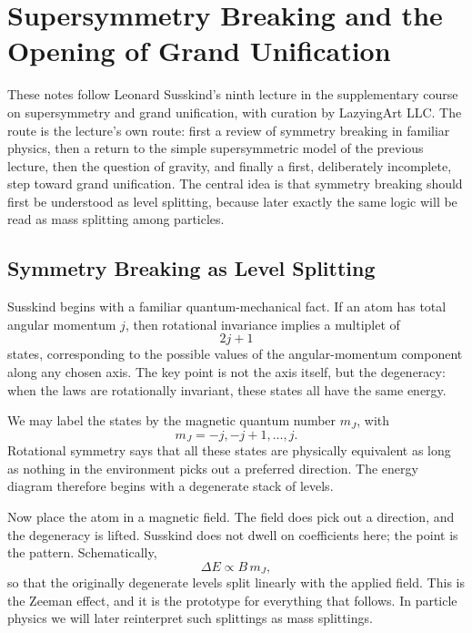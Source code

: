 \chapter{Supersymmetry Breaking and the Opening of Grand Unification}

These notes follow Leonard Susskind's ninth lecture in the supplementary course on supersymmetry and grand unification, with curation by LazyingArt LLC. The route is the lecture's own route: first a review of symmetry breaking in familiar physics, then a return to the simple supersymmetric model of the previous lecture, then the question of gravity, and finally a first, deliberately incomplete, step toward grand unification. The central idea is that symmetry breaking should first be understood as level splitting, because later exactly the same logic will be read as mass splitting among particles.

\section{Symmetry Breaking as Level Splitting}

Susskind begins with a familiar quantum-mechanical fact. If an atom has total angular momentum \(j\), then rotational invariance implies a multiplet of
\begin{equation}
2j+1
\end{equation}
states, corresponding to the possible values of the angular-momentum component along any chosen axis. The key point is not the axis itself, but the degeneracy: when the laws are rotationally invariant, these states all have the same energy.

We may label the states by the magnetic quantum number \(m_J\), with
\begin{equation}
m_J=-j,-j+1,\dots,j.
\end{equation}
Rotational symmetry says that all these states are physically equivalent as long as nothing in the environment picks out a preferred direction. The energy diagram therefore begins with a degenerate stack of levels.

Now place the atom in a magnetic field. The field does pick out a direction, and the degeneracy is lifted. Susskind does not dwell on coefficients here; the point is the pattern. Schematically,
\begin{equation}
\Delta E \propto B\,m_J,
\end{equation}
so that the originally degenerate levels split linearly with the applied field. This is the Zeeman effect, and it is the prototype for everything that follows. In particle physics we will later reinterpret such splittings as mass splittings.

